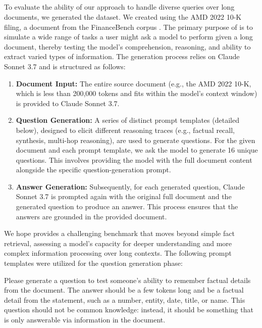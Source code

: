 \subsection{ \genconvo }
To evaluate the ability of our approach to handle diverse queries over long documents, we generated the \genconvo dataset. We created \genconvo using the AMD 2022 10-K filing, a document from the FinanceBench corpus \cite{islam2023financebench}. The primary purpose of \genconvo is to simulate a wide range of tasks a user might ask a model to perform given a long document, thereby testing the model's comprehension, reasoning, and ability to extract varied types of information. The generation process relies on Claude Sonnet 3.7 \cite{anthropic2024claude} and is structured as follows:
\begin{enumerate}[leftmargin=*]
    \item \textbf{Document Input:} The entire source document (e.g., the AMD 2022 10-K, which is less than 200,000 tokens and fits within the model's context window) is provided to Claude Sonnet 3.7.
    \item \textbf{Question Generation:} A series of distinct prompt templates (detailed below), designed to elicit different reasoning traces (e.g., factual recall, synthesis, multi-hop reasoning), are used to generate questions. For the given document and each prompt template, we ask the model to generate 16 unique questions. This involves providing the model with the full document content alongside the specific question-generation prompt.
    \item \textbf{Answer Generation:} Subsequently, for each generated question, Claude Sonnet 3.7 is prompted again with the original full document and the generated question to produce an answer. This process ensures that the answers are grounded in the provided document.
\end{enumerate}
We hope \genconvo provides a challenging benchmark that moves beyond simple fact retrieval, assessing a model's capacity for deeper understanding and more complex information processing over long contexts. The following prompt templates were utilized for the question generation phase:
\begin{examplebox}
    \small
    \ttfamily
Please generate a question to test someone's
ability to remember factual details from the document. The answer should be a few
tokens long and be a factual detail from the statement, such as a number, entity,
date, title, or name.
This question should not be common knowledge: instead, it should be something
that is only answerable via information in the document.
\end{examplebox}
